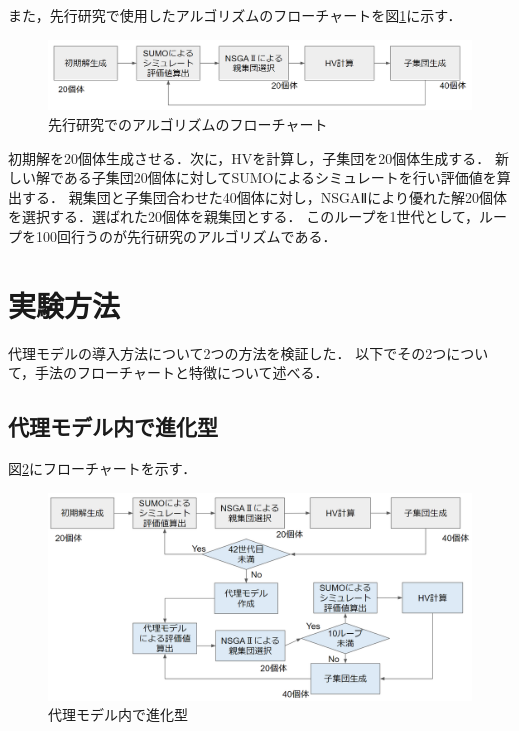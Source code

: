 \documentclass[main]{subfiles}
\begin{document}
    また，先行研究で使用したアルゴリズムのフローチャートを図\ref{old_algo}に示す．
    \begin{figure}
        \centering
        \includegraphics[width=\linewidth]{figures/old_algo.png}
        \caption{先行研究でのアルゴリズムのフローチャート}
        \label{old_algo}
    \end{figure}
    初期解を20個体生成させる．次に，HVを計算し，子集団を20個体生成する．
    新しい解である子集団20個体に対してSUMOによるシミュレートを行い評価値を算出する．
    親集団と子集団合わせた40個体に対し，NSGAⅡにより優れた解20個体を選択する．選ばれた20個体を親集団とする．
    このループを1世代として，ループを100回行うのが先行研究のアルゴリズムである．

    \section{実験方法}
    代理モデルの導入方法について2つの方法を検証した．
    以下でその2つについて，手法のフローチャートと特徴について述べる．
        \subsection{代理モデル内で進化型}
        図\ref{d}にフローチャートを示す．
        \begin{figure}
            \centering
            \includegraphics[width=\linewidth]{figures/d.png}
            \caption{代理モデル内で進化型}
            \label{d}
        \end{figure}
        
\end{document}
